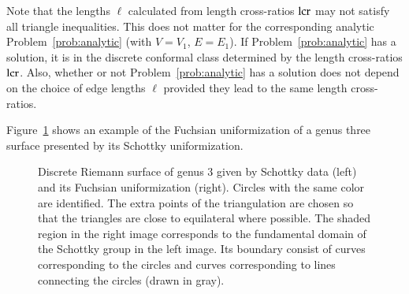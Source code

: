 \documentclass[Thesis]{subfiles}
\begin{document}
Note that the lengths $\ell$ calculated from length cross-ratios
$\operatorname{lcr}$ may not satisfy all triangle inequalities. This does not matter
for the corresponding analytic Problem~\ref{prob:analytic} (with
$V=V_{1}$, $E=E_{1}$). If Problem~\ref{prob:analytic} has a solution,
it is in the discrete conformal class determined by the length
cross-ratios $\operatorname{lcr}$. Also, whether or not Problem~\ref{prob:analytic}
has a solution does not depend on the choice of edge lengths $\ell$
provided they lead to the same length cross-ratios.

Figure~\ref{fig:schottky_g3} shows an example of the Fuchsian
uniformization of a genus three surface presented by its Schottky
uniformization. 

\begin{figure}
  \centering
  \caption{Discrete Riemann surface of genus $3$ given by Schottky
    data (left) and its Fuchsian uniformization (right). Circles with
    the same color are identified. The extra points of the
    triangulation are chosen so that the triangles are close to
    equilateral where possible. The shaded region in the right image
    corresponds to the fundamental domain of the Schottky group in the
    left image. Its boundary consist of curves corresponding to the
    circles and curves corresponding to lines connecting the circles
    (drawn in gray).}
  \label{fig:schottky_g3}
\end{figure}


\end{document}
